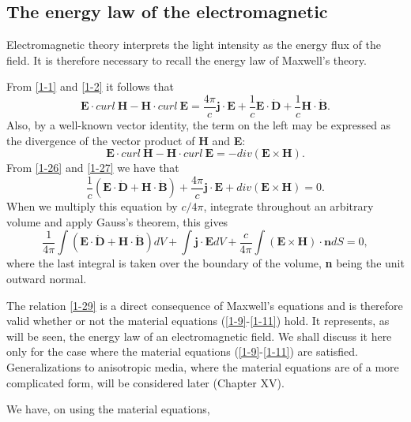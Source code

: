 \documentclass[lang=en,11pt]{elegantbook}
\begin{document}
	\subsection{The energy law of the electromagnetic}
	Electromagnetic theory interprets the light intensity as the energy flux of the field. It is
	therefore necessary to recall the energy law of Maxwell's theory.\par 
	From \eqref{1-1} and \eqref{1-2} it follows that
	\begin{equation}
		\mathbf{E}\cdot curl\ \mathbf{H}-\mathbf{H}\cdot curl\ \mathbf{E}=\frac{4\pi}{c}\mathbf{j\cdot E}+\frac{1}{c}\mathbf{E\cdot\dot{D}}+\frac{1}{c}\mathbf{H\cdot\dot{B}}.
		\label{1-26}
	\end{equation}
	Also, by a well-known vector identity, the term on the left may be expressed as the	divergence of the vector product of \textbf{H} and \textbf{E}:
	\begin{equation}
		\mathbf{E}\cdot curl\ \mathbf{H}-\mathbf{H}\cdot curl\ \mathbf{E}=-div(\mathbf{E}\times\mathbf{H}).
		\label{1-27}
	\end{equation}
	From \eqref{1-26} and \eqref{1-27} we have that
	\begin{equation}
		\frac{1}{c}(\mathbf{E\cdot\dot{D}}+\mathbf{H\cdot\dot{B}})+\frac{4\pi}{c}\mathbf{j\cdot E}+div(\mathbf{E}\times\mathbf{H})=0.
		\label{1-28}
	\end{equation}
	When we multiply this equation by $c/4\pi$, integrate throughout an arbitrary volume and
	apply Gauss's theorem, this gives
	\begin{equation}
		\frac{1}{4\pi}\int(\mathbf{E\cdot\dot{D}}+\mathbf{H\cdot\dot{B}})dV+\int\mathbf{j\cdot E}dV+\frac{c}{4\pi}\int(\mathbf{E}\times\mathbf{H})\cdot\mathbf{n}dS=0,
		\label{1-29}
	\end{equation}
	where the last integral is taken over the boundary of the volume, \textbf{n} being the unit
	outward normal.\par 
	The relation \eqref{1-29} is a direct consequence of Maxwell's equations and is therefore valid whether or not the material equations (\ref{1-9}-\ref{1-11}) hold. It represents, as will be	seen, the energy law of an electromagnetic field. We shall discuss it here only for the	case where the material equations (\ref{1-9}-\ref{1-11}) are satisfied. Generalizations to anisotropic	media, where the material equations are of a more complicated form, will be considered later (Chapter XV).\par 
	We have, on using the material equations,
\end{document}
